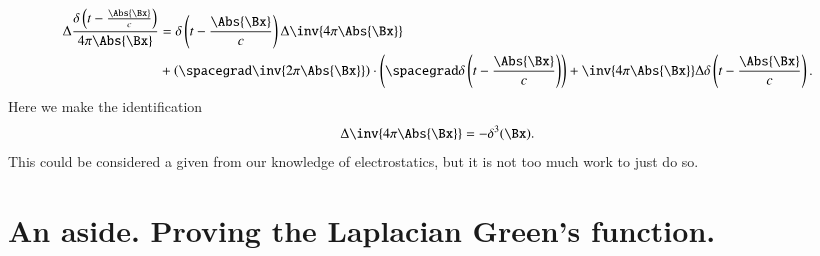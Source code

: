 %
\begin{equation}\label{eqn:relativisticElectrodynamicsL18:131}
\begin{aligned}
\Delta \frac{\delta\left(t - \frac{\Abs{\Bx}}{c}\right)}{4 \pi \Abs{\Bx} }
&=
\delta\left(t - \frac{\Abs{\Bx}}{c}\right)
\Delta
\inv{4 \pi \Abs{\Bx} } \\
&+\left(\spacegrad \inv{2 \pi \Abs{\Bx} }\right)
\cdot
\left(
\spacegrad
\delta\left(t - \frac{\Abs{\Bx}}{c}\right) \right)
+
\inv{4 \pi \Abs{\Bx} }
\Delta
\delta\left(t - \frac{\Abs{\Bx}}{c}\right).
\end{aligned}
\end{equation}
%
Here we make the identification
%
\begin{equation}\label{eqn:relativisticElectrodynamicsL18:132}
\Delta \inv{4 \pi \Abs{\Bx} } = - \delta^3(\Bx).
\end{equation}
%
This could be considered a given from our knowledge of electrostatics, but it is not too much work to just do so.
%
\section{An aside.  Proving the Laplacian Green's function.}

